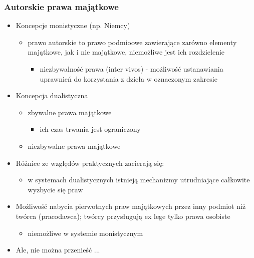 \documentclass[12pt,a4paper]{article}
\begin{document}
\subsubsection{Autorskie prawa majątkowe}
\begin{itemize}
\item Koncepcje monistyczne (np. Niemcy)
	\begin{itemize}
		\item prawo autorskie to prawo podmioowe zawierające zarówno elementy majątkowe, jak i nie majątkowe, niemożliwe jest ich rozdzielenie
			\begin{itemize}
				\item niezbywalność prawa (inter vivos) - możliwość ustanawiania uprawnień do korzystania z dzieła w oznaczonym zakresie
			\end{itemize}
	\end{itemize}
\item Koncepcja dualistyczna
	\begin{itemize}
		\item zbywalne prawa majątkowe
			\begin{itemize}
				\item ich czas trwania jest ograniczony
			\end{itemize}
		\item niezbywalne prawa majątkowe
	\end{itemize}
\item Różnice ze względów praktycznych zacierają się:
	\begin{itemize}
		\item w systemach dualistycznych istnieją mechanizmy utrudniające całkowite wyzbycie się praw
	\end{itemize}
\item Możliwość nabycia pierwotnych praw majątkowych przez inny podmiot niż twórca (pracodawca); twórcy przysługują ex lege tylko prawa osobiste
	\begin{itemize}
		\item niemożliwe w systemie monistycznym
	\end{itemize}
\item Ale, nie można przenieść ...
\end{itemize}
\end{document}
